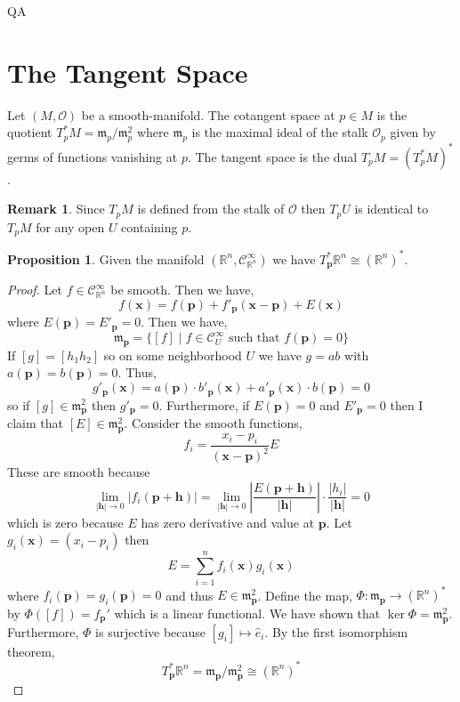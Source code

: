 QA	 \documentclass[12pt]{extarticle}
\newcommand{\R}{\mathbb{R}}
\theoremstyle{definition}
\newtheorem{proposition}[theorem]{Proposition}
\newtheorem{remark}{Remark}
\newenvironment{definition}[1][Definition:]{\begin{trivlist}
\item[\hskip \labelsep {\bfseries #1}]}{\end{trivlist}}
\renewcommand{\bf}[1]{\mathbf{#1}}
\newcommand{\C}[1]{\mathcal{C}^{#1}}
\renewcommand{\O}{\mathcal{O}}
\newcommand{\m}{\mathfrak{m}}
\begin{document}
\section{The Tangent Space}

\begin{definition}
Let $(M, \O)$ be a smooth-manifold. The cotangent space at $p\in M$ is the quotient $T_p^* M = \m_p / \m_p^2$ where $\m_p$ is the maximal ideal of the stalk $\O_p$ given by germs of functions vanishing at $p$. The tangent space is the dual $T_p M =(T_p^* M)^*$.   
\end{definition}

\begin{remark}
Since $T_p M$ is defined from the stalk of $\O$ then $T_p U$ is identical to $T_p M$ for any open $U$ containing $p$. 
\end{remark}

\begin{proposition}
Given the manifold $(\R^n, \C{\infty}_{\R^n})$ we have $T_{\bf{p}}^* \R^n \cong (\R^n)^*$. 
\end{proposition}

\begin{proof}
Let $f \in \C{\infty}_{\R^n}$ be smooth. Then we have,
\[ f(\bf{x}) = f(\bf{p}) + f'_{\bf{p}}(\bf{x} - \bf{p}) + E(\bf{x}) \]
where $E(\bf{p}) = E'_{\bf{p}} = 0$. Then we have,
\[ \m_{\bf{p}} = \{ [f] \mid f \in \C{\infty}_U \text{ such that } f(\bf{p}) = 0 \} \]
If $[g] = [h_1 h_2]$ so on some neighborhood $U$ we have $g = a b$ with $a(\bf{p}) = b(\bf{p}) = 0$. Thus,
\[ g'_{\bf{p}}(\bf{x}) = a(\bf{p}) \cdot b'_{\bf{p}}(\bf{x}) + a'_{\bf{p}}(\bf{x}) \cdot b(\bf{p}) = 0 \]
so if $[g] \in \m_{\bf{p}}^2$ then $g'_{\bf{p}} = 0$.
Furthermore, if $E(\bf{p}) = 0$ and $E'_{\bf{p}} = 0$ then I claim that $[E] \in \m_{\bf{p}}^2$. Consider the smooth functions,
\[ 
f_i = \frac{x_i - p_i}{(\bf{x} - \bf{p})^2} E \]
These are smooth because 
\[ \lim_{|\bf{h}| \to 0} |f_i(\bf{p} + \bf{h})| = \lim_{|\bf{h}| \to 0} \left| \frac{E(\bf{p} + \bf{h})}{|\bf{h}|} \right| \cdot \frac{|h_i|}{|\bf{h}|} = 0 \]
which is zero because $E$ has zero derivative and value at $\bf{p}$. Let $g_i(\bf{x}) = (x_i - p_i)$ then 
\[ E = \sum_{i = 1}^n f_i(\bf{x}) g_i(\bf{x}) \]
where $f_i(\bf{p}) = g_i(\bf{p}) = 0$ and thus $E \in \m_{\bf{p}}^2$. Define the map, $\Phi : \m_{\bf{p}} \to (\R^n)^*$ by $\Phi([f]) = f_{\bf{p}}'$ which is a linear functional. We have shown that $\ker{\Phi} = \m_{\bf{p}}^2$. Furthermore, $\Phi$ is surjective because $[g_i] \mapsto \hat{e}_i$. By the first isomorphism theorem,
\[ T_{\bf{p}}^* \R^n  = \m_{\bf{p}} / \m_{\bf{p}}^2 \cong (\R^n)^* \]
\end{proof}
\end{document}
